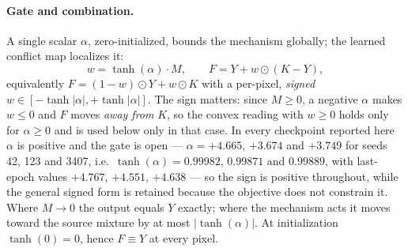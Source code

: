 \documentclass[pdflatex,sn-mathphys-num]{sn-jnl}
\theoremstyle{thmstyleone}%
\theoremstyle{thmstyletwo}%
\theoremstyle{thmstylethree}%
\begin{document}
\paragraph{Gate and combination.} A single scalar $\alpha$, zero-initialized, bounds the mechanism globally; the learned conflict map localizes it:
\begin{equation}\label{eq:gate}
w = \tanh(\alpha)\cdot M, \qquad F = Y + w \odot (K - Y),
\end{equation}
equivalently $F = (1-w) \odot Y + w \odot K$ with a per-pixel, \emph{signed} $w \in [-\tanh|\alpha|, +\tanh|\alpha|]$. The sign matters: since $M \ge 0$, a negative $\alpha$ makes $w \le 0$ and $F$ moves \emph{away from} $K$, so the convex reading with $w \ge 0$ holds only for $\alpha \ge 0$ and is used below only in that case. In every checkpoint reported here $\alpha$ is positive and the gate is open --- $\alpha = +4.665$, $+3.674$ and $+3.749$ for seeds 42, 123 and 3407, i.e.\ $\tanh(\alpha) = 0.99982$, $0.99871$ and $0.99889$, with last-epoch values $+4.767$, $+4.551$, $+4.638$ --- so the sign is positive throughout, while the general signed form is retained because the objective does not constrain it. Where $M \to 0$ the output equals $Y$ exactly; where the mechanism acts it moves toward the source mixture by at most $|\tanh(\alpha)|$. At initialization $\tanh(0) = 0$, hence $F \equiv Y$ at every pixel.
\end{document}
